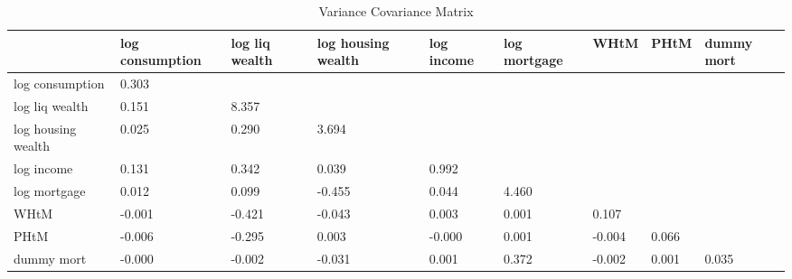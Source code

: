 \begin{table}[htbp]
\caption{\label{clabel} Variance Covariance Matrix}\centering\medskip
\begin{tabular}{lllllllll} \hline \hline
 & log consumption  & log liq wealth  & log housing wealth  & log income  & log mortgage  & WHtM  & PHtM  & dummy mort  \\  \hline 
log consumption &     0.303 \\  
log liq wealth &     0.151 &     8.357 \\  
log housing wealth &     0.025 &     0.290 &     3.694 \\  
log income &     0.131 &     0.342 &     0.039 &     0.992 \\  
log mortgage &     0.012 &     0.099 &    -0.455 &     0.044 &     4.460 \\  
WHtM &    -0.001 &    -0.421 &    -0.043 &     0.003 &     0.001 &     0.107 \\  
PHtM &    -0.006 &    -0.295 &     0.003 &    -0.000 &     0.001 &    -0.004 &     0.066 \\  
dummy mort &    -0.000 &    -0.002 &    -0.031 &     0.001 &     0.372 &    -0.002 &     0.001 &     0.035 \\  
\hline \hline \end{tabular}
\end{table}
